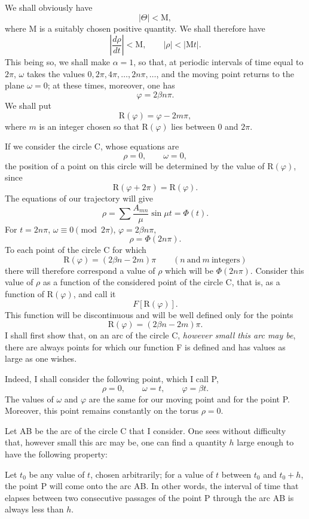 \documentclass[11pt]{article}
\begin{document}
We shall obviously have
\[
|\Theta|<\mathrm{M},
\]
where M is a suitably chosen positive quantity. We shall therefore have
\[
\left|\frac{d\rho}{dt}\right|<\mathrm{M},
\qquad
|\rho|<|\mathrm{M}t|.
\]
This being so, we shall make $\alpha=1$, so that, at periodic intervals of time equal to $2\pi$, $\omega$ takes the values $0,2\pi,4\pi,\ldots,2n\pi,\ldots$, and the moving point returns to the plane $\omega=0$; at these times, moreover, one has
\[
\varphi=2\beta n\pi.
\]
We shall put
\[
\mathrm{R}(\varphi)=\varphi-2m\pi,
\]
where $m$ is an integer chosen so that $\mathrm{R}(\varphi)$ lies between 0 and $2\pi$.

If we consider the circle C, whose equations are
\[
\rho=0,
\qquad
\omega=0,
\]
the position of a point on this circle will be determined by the value of $\mathrm{R}(\varphi)$, since
\[
\mathrm{R}(\varphi+2\pi)=\mathrm{R}(\varphi).
\]
The equations of our trajectory will give
\[
\rho=\sum \frac{A_{mn}}{\mu}\sin\mu t=\Phi(t).
\]
For $t=2n\pi$, $\omega\equiv0\pmod{2\pi}$, $\varphi=2\beta n\pi$,
\[
\rho=\Phi(2n\pi).
\]
To each point of the circle C for which
\[
\mathrm{R}(\varphi)=(2\beta n-2m)\pi
\qquad (n\ \text{and}\ m\ \text{integers})
\]
there will therefore correspond a value of $\rho$ which will be $\Phi(2n\pi)$. Consider this value of $\rho$ as a function of the considered point of the circle C, that is, as a function of $\mathrm{R}(\varphi)$, and call it
\[
F[\mathrm{R}(\varphi)].
\]
This function will be discontinuous and will be well defined only for the points
\[
\mathrm{R}(\varphi)=(2\beta n-2m)\pi.
\]
I shall first show that, on an arc of the circle C, \emph{however small this arc may be}, there are always points for which our function F is defined and has values as large as one wishes.

Indeed, I shall consider the following point, which I call P,
\[
\rho=0,
\qquad
\omega=t,
\qquad
\varphi=\beta t.
\]
The values of $\omega$ and $\varphi$ are the same for our moving point and for the point P. Moreover, this point remains constantly on the torus $\rho=0$.

Let AB be the arc of the circle C that I consider. One sees without difficulty that, however small this arc may be, one can find a quantity $h$ large enough to have the following property:

Let $t_0$ be any value of $t$, chosen arbitrarily; for a value of $t$ between $t_0$ and $t_0+h$, the point P will come onto the arc AB. In other words, the interval of time that elapses between two consecutive passages of the point P through the arc AB is always less than $h$.
\end{document}
